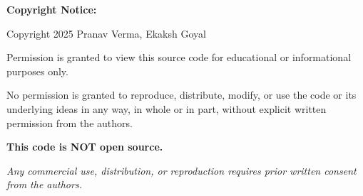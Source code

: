 \documentclass[12pt,a4paper]{article}
\begin{document}
\noindent\textbf{Copyright Notice:}

\vspace{0.3cm}

\noindent Copyright 2025 Pranav Verma, Ekaksh Goyal

\vspace{0.3cm}

\noindent Permission is granted to view this source code for educational or informational purposes only.

\vspace{0.3cm}

\noindent No permission is granted to reproduce, distribute, modify, or use the code or its underlying ideas in any way, in whole or in part, without explicit written permission from the authors.

\vspace{0.3cm}

\noindent\textbf{This code is NOT open source.}

\vspace{0.5cm}

\noindent\textit{Any commercial use, distribution, or reproduction requires prior written consent from the authors.}

\vspace{1cm}
\end{document}
